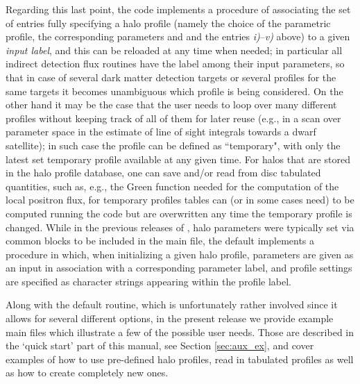 Regarding this last point, the code implements a procedure of associating the set of entries fully specifying a halo 
profile (namely the choice of the parametric profile, the corresponding parameters and and the entries {\sl i)}--{\sl v)} above) to a given {\it input 
label}, and this can be reloaded at any time when needed; in particular all indirect detection flux routines have the label among their 
input parameters, so that in case of several dark matter detection targets or several profiles for the same targets it becomes unambiguous 
which profile is being considered. On the other hand it may be the case that the user needs to loop over many different profiles without 
keeping track of all of them for later reuse (e.g., in a scan over parameter space in the estimate of line of sight integrals towards a 
dwarf satellite); in such case the profile can be defined as ``temporary", with only the latest set temporary profile available at any given time.
For halos that are stored in the halo profile database, one can save and/or read from disc tabulated quantities, such as, e.g., the Green 
function needed for the computation of the local positron flux, for temporary profiles tables can (or in some cases need) to be computed 
running the code but are overwritten any time the temporary profile is changed. While in the previous releases of \ds,  halo parameters 
were typically set via common blocks to be included in the main file, the default  implements a procedure in which,
when initializing a given halo profile, parameters are given as an input in association with a corresponding parameter label, and profile 
settings are specified as character strings appearing within the profile label. 

Along with the default  routine, which is unfortunately rather involved since it 
allows for several different options, in the present release we provide example main files which illustrate 
a few of the possible user needs.
Those are described in the `quick start' part of this manual, see Section \ref{sec:aux_ex}, and cover 
examples of how to use pre-defined halo profiles, read in tabulated profiles as well as how to create
completely new ones.

 
